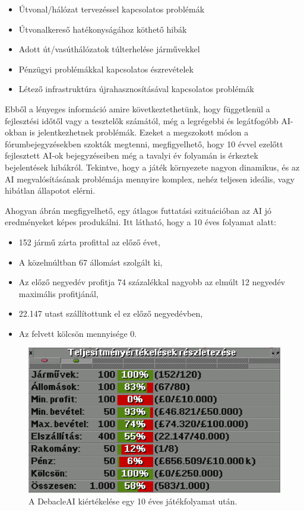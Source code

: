 \begin{itemize}
	\item Útvonal/hálózat tervezéssel kapcsolatos problémák
	\item Útvonalkereső hatékonyságához köthető hibák
	\item Adott út/vasúthálózatok túlterhelése járművekkel
	\item Pénzügyi problémákkal kapcsolatos észrevételek
	\item Létező infrastruktúra újrahasznosításával kapcsolatos problémák
\end{itemize}

Ebből a lényeges információ amire következtethetünk, hogy függetlenül a fejlesztési időtől vagy a tesztelők számától, még a legrégebbi és legátfogóbb AI-okban is jelentkezhetnek problémák. Ezeket a megszokott módon a fórumbejegyzésekben szokták megtenni, megfigyelhető, hogy 10 évvel ezelőtt fejlesztett AI-ok bejegyzéseiben még a tavalyi év folyamán is érkeztek bejelentések hibákról. Tekintve, hogy a játék környezete nagyon dinamikus, és az AI megvalósításának problémája mennyire komplex, nehéz teljesen ideális, vagy hibátlan állapotot elérni.

Ahogyan  ábrán megfigyelhető, egy átlagos futtatási szituációban az AI jó eredményeket képes produkálni. Itt látható, hogy a 10 éves folyamat alatt:

\begin{itemize}
	\item 152 jármű zárta profittal az előző évet,
	\item A közelmúltban 67 állomást szolgált ki,
	\item Az előző negyedév profitja 74 százalékkal nagyobb az elmúlt 12 negyedév maximális profitjánál,
	\item 22.147 utast szállítottunk el ez előző negyedévben,
	\item Az felvett kölcsön mennyisége 0.
\end{itemize}

\begin{figure}
	\centering
	\includegraphics[scale=0.7]{images/atlag.png}
	\caption{A DebacleAI kiértékelése egy 10 éves játékfolyamat után.}
	\label{fig:atlag}
\end{figure}

